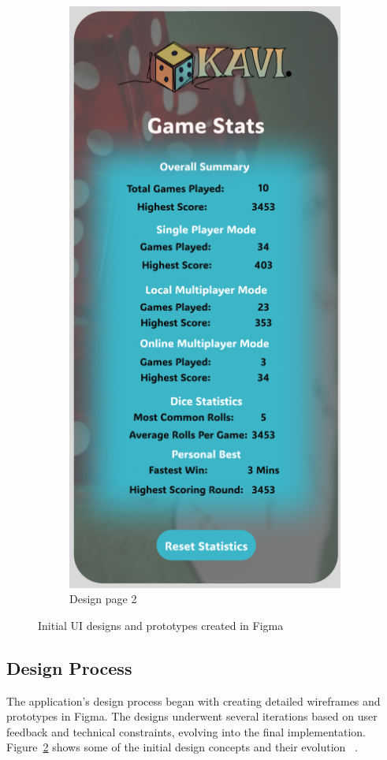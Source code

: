 \begin{figure}[h]
\begin{subfigure}[b]{0.48\textwidth}
        \includegraphics[scale=0.45]{img/stats.png}
        \caption{Design page 2}
        \label{fig:figma_design2}
    \end{subfigure}
    \caption{Initial UI designs and prototypes created in Figma}
    \label{fig:figma_designs}
\end{figure}

\subsection{Design Process}
The application's design process began with creating detailed wireframes and prototypes in Figma. The designs underwent several iterations based on user feedback and technical constraints, evolving into the final implementation. Figure~\ref{fig:figma_designs} shows some of the initial design concepts and their evolution ~\cite{bib:kavifigma}.

